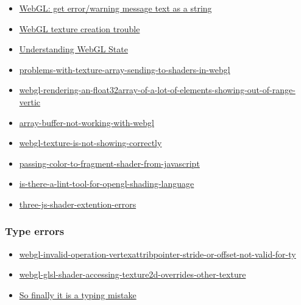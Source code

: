 \begin{itemize}
\tightlist
\item
  \href{http://stackoverflow.com/questions/26400009/webgl-get-error-warning-message-text-as-a-string}{WebGL:
  get error/warning message text as a string}
\item
  \href{http://stackoverflow.com/questions/22666556/webgl-texture-creation-trouble}{WebGL
  texture creation trouble}
\item
  \href{http://stackoverflow.com/questions/28604747/understanding-webgl-state}{Understanding
  WebGL State}
\item
  \href{http://stackoverflow.com/questions/19829244/problems-with-texture-array-sending-to-shaders-in-webgl}{problems-with-texture-array-sending-to-shaders-in-webgl}
\item
  \href{http://stackoverflow.com/questions/31433319/webgl-rendering-an-float32array-of-a-lot-of-elements-showing-out-of-range-vertic}{webgl-rendering-an-float32array-of-a-lot-of-elements-showing-out-of-range-vertic}
\item
  \href{http://stackoverflow.com/questions/21537721/array-buffer-not-working-with-webgl}{array-buffer-not-working-with-webgl}
\item
  \href{http://stackoverflow.com/questions/27524490/webgl-texture-is-not-showing-correctly/27525037\#27525037}{webgl-texture-is-not-showing-correctly}
\item
  \href{http://stackoverflow.com/questions/26134077/passing-color-to-fragment-shader-from-javascript}{passing-color-to-fragment-shader-from-javascript}
\item
  \href{http://stackoverflow.com/questions/4009914/is-there-a-lint-tool-for-opengl-shading-language/4017112\#4017112}{is-there-a-lint-tool-for-opengl-shading-language}
\item
  \href{http://stackoverflow.com/questions/17035588/three-js-shader-extention-errors}{three-js-shader-extention-errors}
\end{itemize}

\subsubsection{Type errors}\label{type-errors}

\begin{itemize}
\tightlist
\item
  \href{http://stackoverflow.com/questions/28747458/webgl-invalid-operation-vertexattribpointer-stride-or-offset-not-valid-for-ty}{webgl-invalid-operation-vertexattribpointer-stride-or-offset-not-valid-for-ty}
\item
  \href{http://stackoverflow.com/questions/10590819/webgl-glsl-shader-accessing-texture2d-overrides-other-texture/10592100\#10592100}{webgl-glsl-shader-accessing-texture2d-overrides-other-texture}
\item
  \href{http://stackoverflow.com/questions/31429591/webgl-code-not-working}{So
  finally it is a typing mistake}
\end{itemize}

